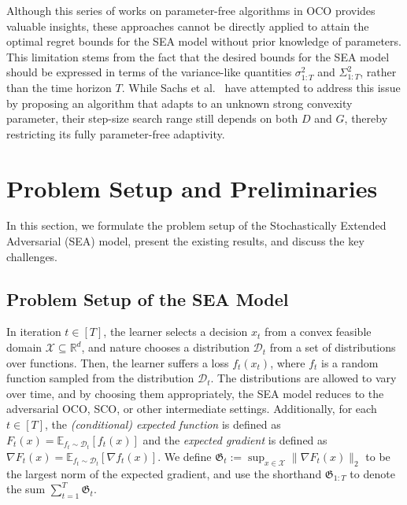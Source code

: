 \documentclass{article}
\renewcommand{\citet}{\citep}
\theoremstyle{plain}
\theoremstyle{definition}
\theoremstyle{remark}
\newcommand{\cD}{\mathcal{D}}
\newcommand{\cX}{\mathcal{X}}
\begin{document}
Although this series of works on parameter-free algorithms in OCO provides valuable insights, these approaches cannot be directly applied to attain the optimal regret bounds for the SEA model without prior knowledge of parameters. This limitation stems from the fact that the desired bounds for the SEA model should be expressed in terms of the variance-like quantities $\sigma^2_{1:T}$ and $\Sigma^2_{1:T}$, rather than the time horizon $T$. While Sachs et al.~\citet{sachs2023accelerated} have attempted to address this issue by proposing an algorithm that adapts to an unknown strong convexity parameter, their step-size search range still depends on both $D$ and $G$, thereby restricting its fully parameter-free adaptivity.

\section{Problem Setup and Preliminaries}\label{sec:setup}
In this section, we formulate the problem setup of the Stochastically Extended Adversarial (SEA) model, present the existing results, and discuss the key challenges.

\subsection{Problem Setup of the SEA Model}
In iteration $t \in [T]$, the learner selects a decision $x_t$ from a convex feasible domain $\cX \subseteq \mathbb{R}^d$, and nature chooses a distribution $\cD_t$ from a set of distributions over functions. Then, the learner suffers a loss $f_t(x_t)$, where  $f_t$ is a random function sampled from the distribution $\cD_t$. The distributions are allowed to vary over time, and by choosing them appropriately, the SEA model reduces to the adversarial OCO, SCO, or other intermediate settings. Additionally, for each $t \in [T]$, the {\em (conditional) expected function} is defined as $F_{t}(x) =\mathbb{E}_{f_t \sim \cD_t}[f_t(x)]$ and the {\em expected gradient} is defined as $\nabla F_{t}(x) =\mathbb{E}_{f_t \sim \cD_t}[\nabla f_t(x)]$. We define $\mathfrak{G}_t := \sup_{x \in \cX} \| \nabla F_{t}(x) \|_2$ to be the largest norm of the expected gradient, and use the shorthand $\mathfrak{G}_{1:T}$ to denote the sum $\sum_{t=1}^T \mathfrak{G}_t $.
\end{document}
